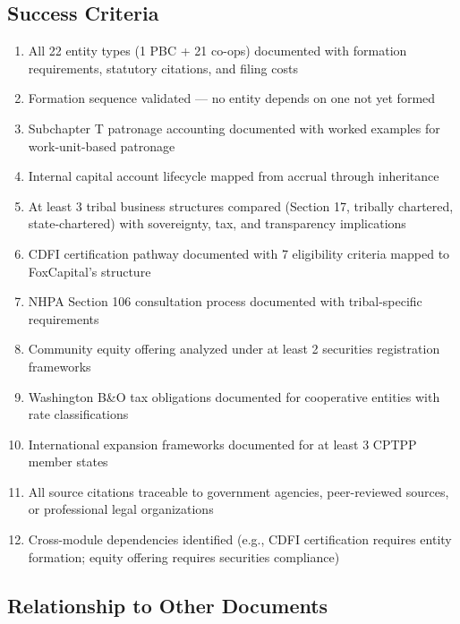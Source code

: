 \documentclass[11pt,letterpaper]{article}
\begin{document}
\subsection{Success Criteria}

\begin{enumerate}[leftmargin=2em]
  \item All 22 entity types (1 PBC + 21 co-ops) documented with formation requirements, statutory citations, and filing costs
  \item Formation sequence validated --- no entity depends on one not yet formed
  \item Subchapter T patronage accounting documented with worked examples for work-unit-based patronage
  \item Internal capital account lifecycle mapped from accrual through inheritance
  \item At least 3 tribal business structures compared (Section 17, tribally chartered, state-chartered) with sovereignty, tax, and transparency implications
  \item CDFI certification pathway documented with 7 eligibility criteria mapped to FoxCapital's structure
  \item NHPA Section 106 consultation process documented with tribal-specific requirements
  \item Community equity offering analyzed under at least 2 securities registration frameworks
  \item Washington B\&O tax obligations documented for cooperative entities with rate classifications
  \item International expansion frameworks documented for at least 3 CPTPP member states
  \item All source citations traceable to government agencies, peer-reviewed sources, or professional legal organizations
  \item Cross-module dependencies identified (e.g., CDFI certification requires entity formation; equity offering requires securities compliance)
\end{enumerate}

\subsection{Relationship to Other Documents}
\end{document}
